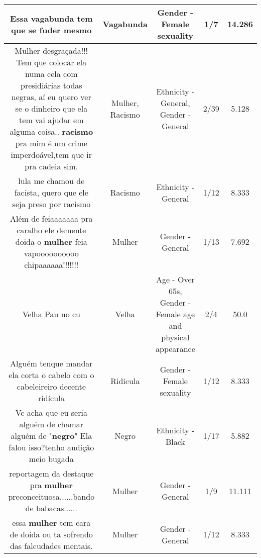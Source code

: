 \documentclass[11pt]{article}
\newlength\mylength
\begin{document}
\begin{center}
\begin{longtable}{|C{.65\mylength}|C{.30\mylength}|C{.12\mylength}|C{.12\mylength}|C{.12\mylength}|}
  \small Essa \textbf{vagabunda} tem que se fuder mesmo\normalsize   & Vagabunda & Gender - Female sexuality & 1/7 & 14.286 \\  \hline
  \small Mulher desgraçada!!! Tem que colocar ela numa cela com presidiárias todas negras, aí eu quero ver se o dinheiro que ela tem vai ajudar em alguma coisa.. \textbf{racismo} pra mim é um crime imperdoável,tem que ir pra cadeia sim.\normalsize   & Mulher, Racismo & Ethnicity - General, Gender - General & 2/39 & 5.128 \\  \hline
  \small lula me chamou de facista, quero que ele seja preso por racismo\normalsize   & Racismo & Ethnicity - General & 1/12 & 8.333 \\  \hline
  \small Além de feiaaaaaaa pra caralho ele demente doida o \textbf{mulher} feia vapoooooooooo chipaaaaaa!!!!!!!\normalsize   & Mulher & Gender - General & 1/13 & 7.692 \\  \hline
  \small Velha Pau no cu\normalsize   & Velha & Age - Over 65s, Gender - Female age and physical appearance & 2/4 & 50.0 \\  \hline
  \small Alguém tenque mandar ela corta o cabelo com o cabeleireiro decente ridícula\normalsize   & Ridícula & Gender - Female sexuality & 1/12 & 8.333 \\  \hline
  \small Vc acha que eu seria alguém de chamar alguém de "\textbf{negro}"  Ela falou isso?tenho audição meio bugada\normalsize   & Negro & Ethnicity - Black & 1/17 & 5.882 \\  \hline
  \small reportagem da destaque pra \textbf{mulher} preconceituosa......bando de babacas......\normalsize   & Mulher & Gender - General & 1/9 & 11.111 \\  \hline
  \small essa  \textbf{mulher} tem cara de doida ou  ta  sofrendo  das  falcudades mentais.\normalsize   & Mulher & Gender - General & 1/12 & 8.333 \\  \hline

\end{longtable}
\end{center}
\end{document}
